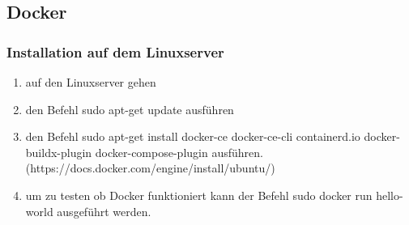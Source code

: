 \subsection{Docker}
	\subsubsection{Installation auf dem Linuxserver}
	\begin{enumerate}
	\item auf den Linuxserver gehen
	\item den Befehl sudo apt-get update ausführen
	\item den Befehl sudo apt-get install docker-ce docker-ce-cli containerd.io docker-buildx-plugin docker-compose-plugin ausführen.
	(https://docs.docker.com/engine/install/ubuntu/)
	\item um zu testen ob Docker funktioniert kann der Befehl sudo docker run hello-world ausgeführt werden. 
	\end{enumerate}